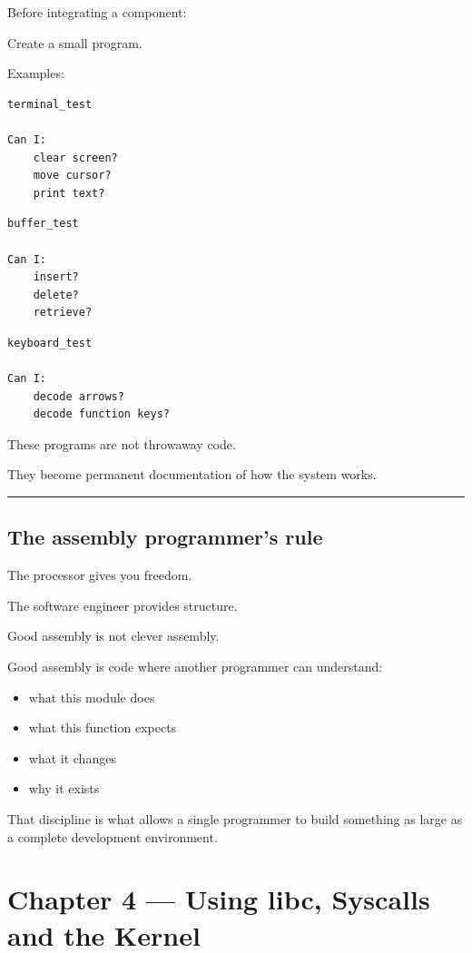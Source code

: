 \documentclass[
  oneside,
  openany]{book}
\providecommand{\tightlist}{%
  \setlength{\itemsep}{0pt}\setlength{\parskip}{0pt}}
\begin{document}
Before integrating a component:

Create a small program.

Examples:

\begin{verbatim}
terminal_test

Can I:
    clear screen?
    move cursor?
    print text?
\end{verbatim}

\begin{verbatim}
buffer_test

Can I:
    insert?
    delete?
    retrieve?
\end{verbatim}

\begin{verbatim}
keyboard_test

Can I:
    decode arrows?
    decode function keys?
\end{verbatim}

These programs are not throwaway code.

They become permanent documentation of how the system works.

\begin{center}\rule{0.5\linewidth}{0.5pt}\end{center}

\hypertarget{the-assembly-programmers-rule}{%
\section{The assembly programmer's
rule}\label{the-assembly-programmers-rule}}

The processor gives you freedom.

The software engineer provides structure.

Good assembly is not clever assembly.

Good assembly is code where another programmer can understand:

\begin{itemize}
\tightlist
\item
  what this module does
\item
  what this function expects
\item
  what it changes
\item
  why it exists
\end{itemize}

That discipline is what allows a single programmer to build something as
large as a complete development environment.

\hypertarget{chapter-4-using-libc-syscalls-and-the-kernel}{%
\chapter{Chapter 4 --- Using libc, Syscalls and the
Kernel}\label{chapter-4-using-libc-syscalls-and-the-kernel}}
\end{document}
